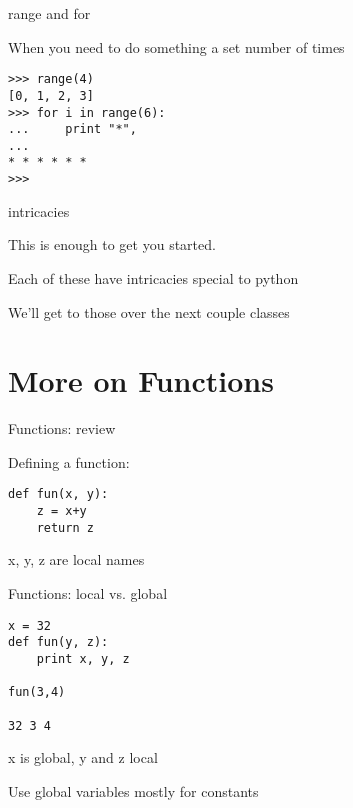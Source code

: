 \documentclass{beamer}
\begin{document}
\begin{frame}[fragile]{range and for}

{\Large When you need to do something a set number of times}

\vfill
\begin{verbatim}
>>> range(4)
[0, 1, 2, 3]
>>> for i in range(6):
...     print "*",
... 
* * * * * *
>>> 
\end{verbatim}

\end{frame}

\begin{frame}[fragile]{intricacies}

\vfill
{\Large This is enough to get you started.}

\vfill
{\Large Each of these have intricacies special to python}

\vfill
{\Large We'll get to those over the next couple classes}

\vfill

\end{frame}

\section{More on Functions}

\begin{frame}[fragile]{Functions: review}

{\Large Defining a function:}

\begin{verbatim}
def fun(x, y):
    z = x+y
    return z
\end{verbatim}

{\Large x, y, z are local names}

\end{frame}


\begin{frame}[fragile]{Functions: local vs. global}

\begin{verbatim}
x = 32
def fun(y, z):
    print x, y, z

fun(3,4)

32 3 4
\end{verbatim}
{\large x is global, y and z local}

\vfill
{\Large Use global variables mostly for constants}

\end{frame}
\end{document}
